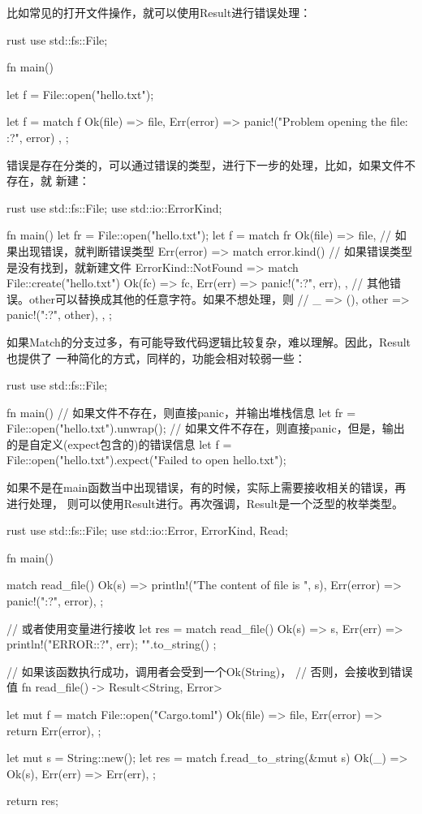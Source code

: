 比如常见的打开文件操作，就可以使用Result进行错误处理：
\begin{code-block}{rust}
use std::fs::File;

fn main() {
    let f = File::open("hello.txt");

    let f = match f {
        Ok(file) => file,
        Err(error) => {
            panic!("Problem opening the file: {:?}", error)
        },
    };
}
\end{code-block}

错误是存在分类的，可以通过错误的类型，进行下一步的处理，比如，如果文件不存在，就
新建：
\begin{code-block}{rust}
use std::fs::File;
use std::io::ErrorKind;

fn main() {
    let fr = File::open("hello.txt");
    let f = match fr {
        Ok(file) => file,
        // 如果出现错误，就判断错误类型
        Err(error) => match error.kind() {
            // 如果错误类型是没有找到，就新建文件
            ErrorKind::NotFound => match File::create("hello.txt") {
                Ok(fc) => fc,
                Err(err) => panic!("{:?}", err),
            },
            // 其他错误。other可以替换成其他的任意字符。如果不想处理，则
            // _ => (),
            other => panic!("{:?}", other),
        },
    };
}
\end{code-block}

如果Match的分支过多，有可能导致代码逻辑比较复杂，难以理解。因此，Result也提供了
一种简化的方式，同样的，功能会相对较弱一些：
\begin{code-block}{rust}
use std::fs::File;

fn main() {
    // 如果文件不存在，则直接panic，并输出堆栈信息
    let fr = File::open("hello.txt").unwrap();
    // 如果文件不存在，则直接panic，但是，输出的是自定义(expect包含的)的错误信息
    let f = File::open("hello.txt").expect("Failed to open hello.txt");
}
\end{code-block}

如果不是在main函数当中出现错误，有的时候，实际上需要接收相关的错误，再进行处理，
则可以使用Result进行。再次强调，Result是一个泛型的枚举类型。
\begin{code-block}{rust}
use std::fs::File;
use std::io::{Error, ErrorKind, Read};

fn main() {
    match read_file() {
       Ok(s) => println!("The content of file is {}", s),
       Err(error) => panic!("{:?}", error),
    };

    // 或者使用变量进行接收
    let res = match read_file() {
        Ok(s) => s,
        Err(err) => {
            println!("ERROR:{:?}", err);
            "".to_string()
        }
    };
}

// 如果该函数执行成功，调用者会受到一个Ok(String)，
// 否则，会接收到错误值
fn read_file() -> Result<String, Error> {
    let mut f = match File::open("Cargo.toml") {
        Ok(file) => file,
        Err(error) => return Err(error),
    };

    let mut s = String::new();
    let res = match f.read_to_string(&mut s) {
        Ok(_) => Ok(s),
        Err(err) => Err(err),
    };

    return res;
}
\end{code-block}

